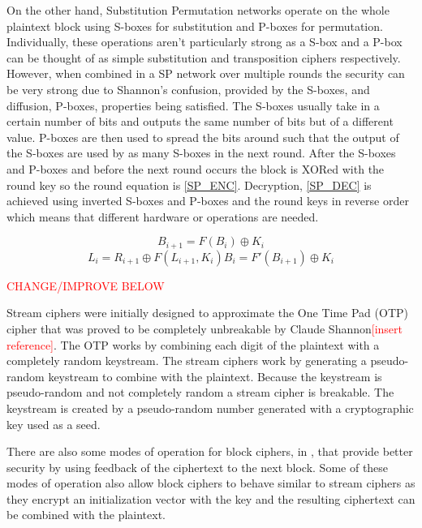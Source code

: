 \documentclass[12pt,twoside,a4paper]{report}
\begin{document}
	On the other hand, Substitution Permutation networks operate on the whole plaintext block using S-boxes for substitution and P-boxes for permutation. Individually, these operations aren't particularly strong as a S-box and a P-box can be thought of as simple substitution and transposition ciphers respectively. However, when combined in a SP network over multiple rounds the security can be very strong due to Shannon's confusion, provided by the S-boxes, and diffusion, P-boxes, properties being satisfied\cite{Shannon1949}. The S-boxes usually take in a certain number of bits and outputs the same number of bits but of a different value. P-boxes are then used to spread the bits around such that the output of the S-boxes are used by as many S-boxes in the next round. After the S-boxes and P-boxes and before the next round occurs the block is XORed with the round key so the round equation is \autoref{SP_ENC}. Decryption, \autoref{SP_DEC} is achieved using inverted S-boxes and P-boxes and the round keys in reverse order which means that different hardware or operations are needed.
    
	\begin{equation}
	\label{SP_ENC}
	B_{i+1} = F(B_i) \oplus K_i
	\end{equation}
	\begin{equation}
	\label{SP_DEC}
	L_i = R_{i+1} \oplus F(L_{i+1}, K_i)B_i = F'(B_{i+1}) \oplus K_i
	\end{equation}
    
	\textcolor{red}{CHANGE/IMPROVE BELOW} 
    
	Stream ciphers were initially designed to approximate the One Time Pad (OTP) cipher that was proved to be completely unbreakable by Claude Shannon\textcolor{red}{[insert reference]}. The OTP works by combining each digit of the plaintext with a completely random keystream. The stream ciphers work by generating a pseudo-random keystream to combine with the plaintext\cite{Robshaw1995}. Because the keystream is pseudo-random and not completely random a stream cipher is breakable. The keystream is created by a pseudo-random number generated with a cryptographic key used as a seed.   
    
	There are also some modes of operation for block ciphers, in \cite{Dworkin2001}, that provide better security by using feedback of the ciphertext to the next block. Some of these modes of operation also allow block ciphers to behave similar to stream ciphers as they encrypt an initialization vector with the key and the resulting ciphertext can be combined with the plaintext.
    
\end{document}
